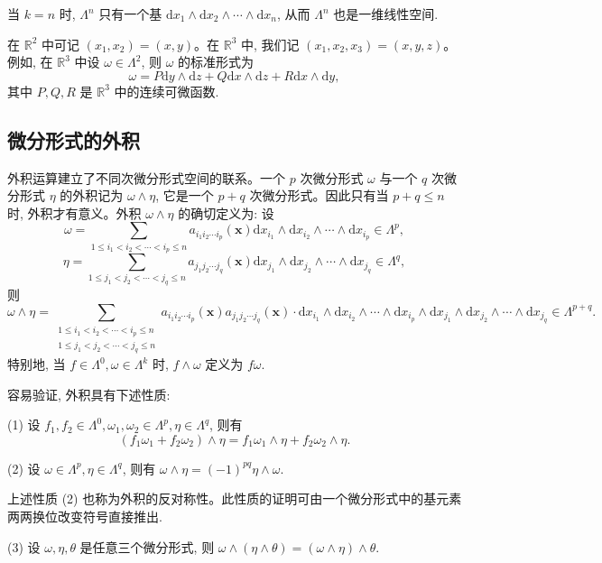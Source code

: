当 $k=n$ 时, $\Lambda^n$ 只有一个基 $\mathrm dx_1\wedge\mathrm dx_2\wedge\cdots\wedge\mathrm dx_n$, 从而 $\Lambda^n$ 也是一维线性空间.

在 $\mathbb R^2$ 中可记 $(x_1,x_2)=(x,y)$。在 $\mathbb R^3$ 中, 我们记 $(x_1,x_2,x_3)=(x,y,z)$。例如, 在 $\mathbb R^3$ 中设 $\omega\in\Lambda^2$, 则 $\omega$ 的标准形式为
\[
  \omega=P\mathrm dy\wedge\mathrm dz+Q\mathrm dx\wedge\mathrm dz+R\mathrm dx\wedge\mathrm dy,
\]
其中 $P,Q,R$ 是 $\mathbb R^3$ 中的连续可微函数.

\subsection{微分形式的外积}
\label{subsec:ma-16-6-2}

外积运算建立了不同次微分形式空间的联系。一个 $p$ 次微分形式 $\omega$ 与一个 $q$ 次微分形式 $\eta$ 的外积记为 $\omega\wedge\eta$, 它是一个 $p+q$ 次微分形式。因此只有当 $p+q\leqslant n$ 时, 外积才有意义。外积 $\omega\wedge\eta$ 的确切定义为: 设
\[
  \omega=\sum_{1\leqslant i_1<i_2<\cdots<i_p\leqslant n}
  a_{i_1i_2\cdots i_p}(\boldsymbol x)
  \mathrm dx_{i_1}\wedge\mathrm dx_{i_2}\wedge\cdots\wedge\mathrm dx_{i_p}\in\Lambda^p,
\]
\[
  \eta=\sum_{1\leqslant j_1<j_2<\cdots<j_q\leqslant n}
  a_{j_1j_2\cdots j_q}(\boldsymbol x)
  \mathrm dx_{j_1}\wedge\mathrm dx_{j_2}\wedge\cdots\wedge\mathrm dx_{j_q}\in\Lambda^q,
\]
则
\[
  \omega\wedge\eta=
  \sum_{\substack{1\leqslant i_1<i_2<\cdots<i_p\leqslant n\\
  1\leqslant j_1<j_2<\cdots<j_q\leqslant n}}
  a_{i_1i_2\cdots i_p}(\boldsymbol x)a_{j_1j_2\cdots j_q}(\boldsymbol x)
  \cdot\mathrm dx_{i_1}\wedge\mathrm dx_{i_2}\wedge\cdots\wedge\mathrm dx_{i_p}
  \wedge\mathrm dx_{j_1}\wedge\mathrm dx_{j_2}\wedge\cdots\wedge\mathrm dx_{j_q}\in\Lambda^{p+q}.
\]
特别地, 当 $f\in\Lambda^0,\omega\in\Lambda^k$ 时, $f\wedge\omega$ 定义为 $f\omega$.

容易验证, 外积具有下述性质:

(1) 设 $f_1,f_2\in\Lambda^0,\omega_1,\omega_2\in\Lambda^p,\eta\in\Lambda^q$, 则有
\[
  (f_1\omega_1+f_2\omega_2)\wedge\eta
  =f_1\omega_1\wedge\eta+f_2\omega_2\wedge\eta.
\]

(2) 设 $\omega\in\Lambda^p,\eta\in\Lambda^q$, 则有 $\omega\wedge\eta=(-1)^{pq}\eta\wedge\omega$.

上述性质 (2) 也称为外积的反对称性。此性质的证明可由一个微分形式中的基元素两两换位改变符号直接推出.

(3) 设 $\omega,\eta,\theta$ 是任意三个微分形式, 则 $\omega\wedge(\eta\wedge\theta)=(\omega\wedge\eta)\wedge\theta$.

